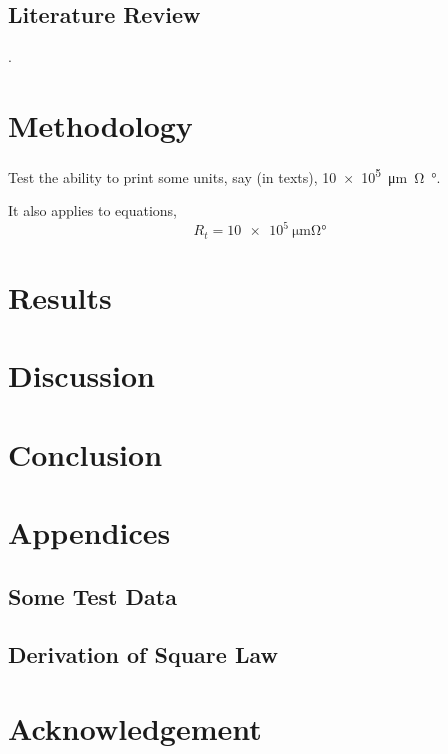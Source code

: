 \documentclass{senior-design}
\begin{document}
\section{Literature Review}
\lipsum[2]\cite{j.a.prufrock2009,li1999,ref1}.
\chapter{Methodology}

Test the ability to print some units, say (in texts), \SI{10e5}{\um\ohm\degree}.

It also applies to equations,
\begin{equation}
    R_{t}=\SI{10e5}{\um\ohm\degree}
\end{equation}

\chapter{Results}

\chapter{Discussion}

\chapter{Conclusion}


\renewcommand*{\UrlFont}{\rmfamily}
\printbibliography[title={References},heading=bibintoc]

\backmatter
\chapter{Appendices}
\renewcommand{\thesection}{\Alph{section}}
\section{Some Test Data}

\section{Derivation of Square Law}

\renewcommand{\thesection}{\arabic{chapter}.\arabic{section}}

\chapter{Acknowledgement}

\end{document}
